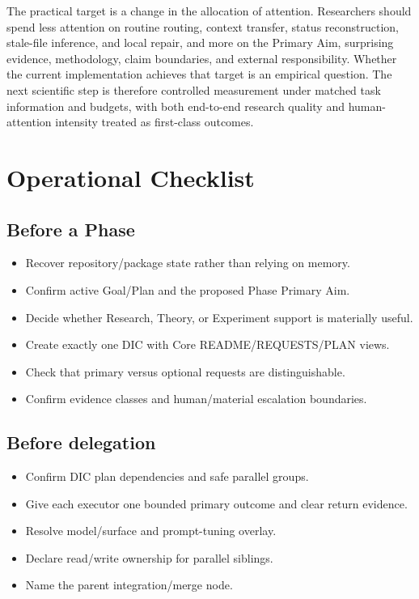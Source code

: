 \documentclass[11pt,a4paper]{article}
\begin{document}
The practical target is a change in the allocation of attention. Researchers should spend less attention on routine routing, context transfer, status reconstruction, stale-file inference, and local repair, and more on the Primary Aim, surprising evidence, methodology, claim boundaries, and external responsibility. Whether the current implementation achieves that target is an empirical question. The next scientific step is therefore controlled measurement under matched task information and budgets, with both end-to-end research quality and human-attention intensity treated as first-class outcomes.


\appendix
\section{Operational Checklist}\label{sec:operational-checklist}
\subsection{Before a Phase}
\begin{itemize}
\item Recover repository/package state rather than relying on memory.
\item Confirm active Goal/Plan and the proposed Phase Primary Aim.
\item Decide whether Research, Theory, or Experiment support is materially useful.
\item Create exactly one DIC with Core README/REQUESTS/PLAN views.
\item Check that primary versus optional requests are distinguishable.
\item Confirm evidence classes and human/material escalation boundaries.
\end{itemize}

\subsection{Before delegation}
\begin{itemize}
\item Confirm DIC plan dependencies and safe parallel groups.
\item Give each executor one bounded primary outcome and clear return evidence.
\item Resolve model/surface and prompt-tuning overlay.
\item Declare read/write ownership for parallel siblings.
\item Name the parent integration/merge node.
\end{itemize}
\end{document}
